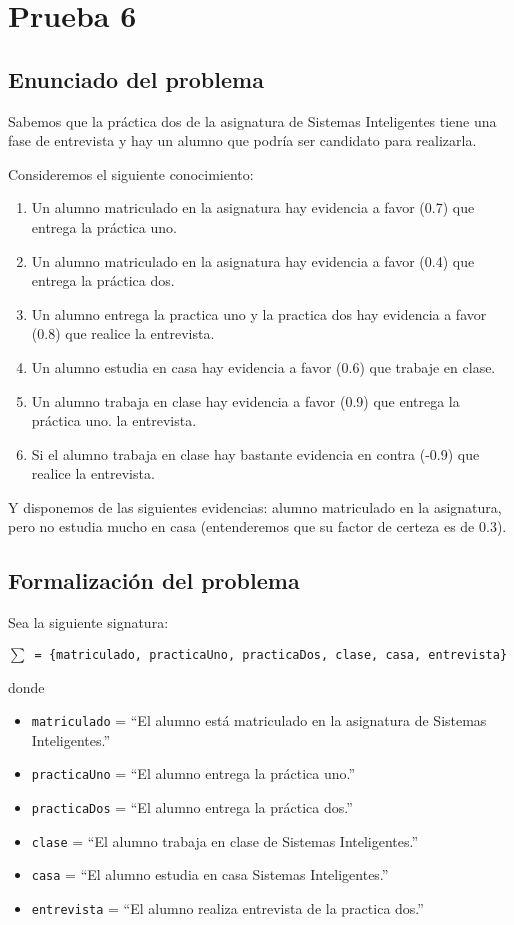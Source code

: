 \section{Prueba 6}
\subsection{Enunciado del problema}
\par Sabemos que la práctica dos de la asignatura de Sistemas Inteligentes tiene una
fase de entrevista y hay un alumno que podría ser candidato para realizarla.
\par Consideremos el siguiente conocimiento:
\begin{enumerate}
    \item Un alumno matriculado en la asignatura hay evidencia a favor (0.7) que entrega la práctica uno.
    \item Un alumno matriculado en la asignatura hay evidencia a favor (0.4) que entrega la práctica dos.
    \item Un alumno entrega la practica uno y la practica dos hay evidencia a favor (0.8) que
realice la entrevista.
    \item Un alumno estudia en casa hay evidencia a favor (0.6) que trabaje en clase. 
    \item Un alumno trabaja en clase hay evidencia a favor (0.9) que entrega la práctica uno.
la entrevista.
    \item Si el alumno trabaja en clase hay bastante evidencia en contra (-0.9) que realice la entrevista.
\end{enumerate}
\par Y disponemos de las siguientes evidencias: alumno matriculado en la asignatura,
pero no estudia mucho en casa (entenderemos que su factor de certeza es de 0.3).

\subsection{Formalización del problema}
\par Sea la siguiente signatura:
\par \texttt{$\sum$ = \{matriculado, practicaUno, practicaDos, clase, casa, entrevista\}}
\par donde
\begin{itemize}
    \item \texttt{matriculado} = ``El alumno está matriculado en la asignatura de Sistemas Inteligentes.''
    \item \texttt{practicaUno} = ``El alumno entrega la práctica uno.''
    \item \texttt{practicaDos} = ``El alumno entrega la práctica dos.''
    \item \texttt{clase} = ``El alumno trabaja en clase de Sistemas Inteligentes.''
    \item \texttt{casa} = ``El alumno estudia en casa Sistemas Inteligentes.''
    \item \texttt{entrevista} = ``El alumno realiza entrevista de la practica dos.''
\end{itemize}

